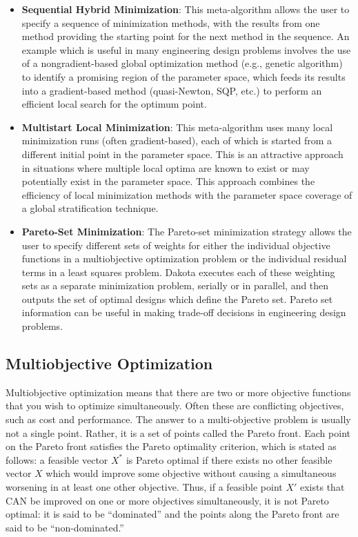 \begin{itemize}
\item \textbf{Sequential Hybrid Minimization}: This meta-algorithm
  allows the user to specify a sequence of minimization methods, with
  the results from one method providing the starting point for the
  next method in the sequence. An example which is useful in many
  engineering design problems involves the use of a nongradient-based
  global optimization method (e.g., genetic algorithm) to identify a
  promising region of the parameter space, which feeds its results
  into a gradient-based method (quasi-Newton, SQP, etc.) to perform an
  efficient local search for the optimum point.

\item \textbf{Multistart Local Minimization}: This meta-algorithm uses
  many local minimization runs (often gradient-based), each of which
  is started from a different initial point in the parameter
  space. This is an attractive approach in situations where multiple
  local optima are known to exist or may potentially exist in the
  parameter space. This approach combines the efficiency of local
  minimization methods with the parameter space coverage of a global
  stratification technique.

\item \textbf{Pareto-Set Minimization}: The Pareto-set minimization
  strategy allows the user to specify different sets of weights for
  either the individual objective functions in a multiobjective
  optimization problem or the individual residual terms in a least
  squares problem. Dakota executes each of these weighting sets as a
  separate minimization problem, serially or in parallel, and then
  outputs the set of optimal designs which define the Pareto
  set. Pareto set information can be useful in making trade-off
  decisions in engineering design problems.
\end{itemize}

\subsection{Multiobjective Optimization}
\label{opt:additional:multiobjective}

Multiobjective optimization means that there are two or more objective
functions that you wish to optimize simultaneously. Often these are
conflicting objectives, such as cost and performance. The answer to a
multi-objective problem is usually not a single point. Rather, it is a
set of points called the Pareto front. Each point on the Pareto front
satisfies the Pareto optimality criterion, which is stated as follows:
a feasible vector $X^{*}$ is Pareto optimal if there exists no other
feasible vector $X$ which would improve some objective without causing
a simultaneous worsening in at least one other objective. Thus, if a
feasible point $X'$ exists that CAN be improved on one or more
objectives simultaneously, it is not Pareto optimal: it is said to be
``dominated'' and the points along the Pareto front are said to be
``non-dominated.''

